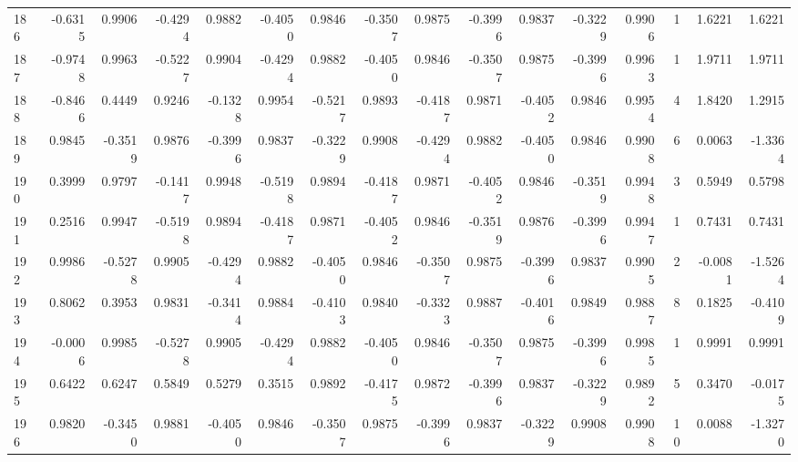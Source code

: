 \begin{tabular}{lrrrrrrrrrrrrrrr}
186 &     -0.6315 &  0.9906 & -0.4294 &  0.9882 & -0.4050 &  0.9846 & -0.3507 &  0.9875 & -0.3996 &  0.9837 &  -0.3229 &     0.9906 &      1 &                    1.6221 &                     1.6221 \\
187 &     -0.9748 &  0.9963 & -0.5227 &  0.9904 & -0.4294 &  0.9882 & -0.4050 &  0.9846 & -0.3507 &  0.9875 &  -0.3996 &     0.9963 &      1 &                    1.9711 &                     1.9711 \\
188 &     -0.8466 &  0.4449 &  0.9246 & -0.1328 &  0.9954 & -0.5217 &  0.9893 & -0.4187 &  0.9871 & -0.4052 &   0.9846 &     0.9954 &      4 &                    1.8420 &                     1.2915 \\
189 &      0.9845 & -0.3519 &  0.9876 & -0.3996 &  0.9837 & -0.3229 &  0.9908 & -0.4294 &  0.9882 & -0.4050 &   0.9846 &     0.9908 &      6 &                    0.0063 &                    -1.3364 \\
190 &      0.3999 &  0.9797 & -0.1417 &  0.9948 & -0.5198 &  0.9894 & -0.4187 &  0.9871 & -0.4052 &  0.9846 &  -0.3519 &     0.9948 &      3 &                    0.5949 &                     0.5798 \\
191 &      0.2516 &  0.9947 & -0.5198 &  0.9894 & -0.4187 &  0.9871 & -0.4052 &  0.9846 & -0.3519 &  0.9876 &  -0.3996 &     0.9947 &      1 &                    0.7431 &                     0.7431 \\
192 &      0.9986 & -0.5278 &  0.9905 & -0.4294 &  0.9882 & -0.4050 &  0.9846 & -0.3507 &  0.9875 & -0.3996 &   0.9837 &     0.9905 &      2 &                   -0.0081 &                    -1.5264 \\
193 &      0.8062 &  0.3953 &  0.9831 & -0.3414 &  0.9884 & -0.4103 &  0.9840 & -0.3323 &  0.9887 & -0.4016 &   0.9849 &     0.9887 &      8 &                    0.1825 &                    -0.4109 \\
194 &     -0.0006 &  0.9985 & -0.5278 &  0.9905 & -0.4294 &  0.9882 & -0.4050 &  0.9846 & -0.3507 &  0.9875 &  -0.3996 &     0.9985 &      1 &                    0.9991 &                     0.9991 \\
195 &      0.6422 &  0.6247 &  0.5849 &  0.5279 &  0.3515 &  0.9892 & -0.4175 &  0.9872 & -0.3996 &  0.9837 &  -0.3229 &     0.9892 &      5 &                    0.3470 &                    -0.0175 \\
196 &      0.9820 & -0.3450 &  0.9881 & -0.4050 &  0.9846 & -0.3507 &  0.9875 & -0.3996 &  0.9837 & -0.3229 &   0.9908 &     0.9908 &     10 &                    0.0088 &                    -1.3270 \\

\end{tabular}
